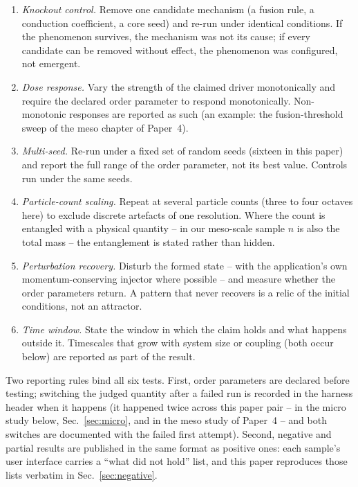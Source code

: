 \documentclass[aps,reprint,amsmath,amssymb,nofootinbib,superscriptaddress,floatfix]{revtex4-2}
\begin{document}
\begin{enumerate}
\item \emph{Knockout control.} Remove one candidate mechanism (a fusion
  rule, a conduction coefficient, a core seed) and re-run under identical
  conditions. If the phenomenon survives, the mechanism was not its
  cause; if every candidate can be removed without effect, the
  phenomenon was configured, not emergent.
\item \emph{Dose response.} Vary the strength of the claimed driver
  monotonically and require the declared order parameter to respond
  monotonically. Non-monotonic responses are reported as such (an
  example: the fusion-threshold sweep of the meso chapter of Paper~4).
\item \emph{Multi-seed.} Re-run under a fixed set of random seeds
  (sixteen in this paper) and report the full range of the order
  parameter, not its best value. Controls run under the same seeds.
\item \emph{Particle-count scaling.} Repeat at several particle counts
  (three to four octaves here) to exclude discrete artefacts of one
  resolution. Where the count is entangled with a physical quantity --
  in our meso-scale sample $n$ is also the total mass -- the entanglement
  is stated rather than hidden.
\item \emph{Perturbation recovery.} Disturb the formed state -- with the
  application's own momentum-conserving injector where possible -- and
  measure whether the order parameters return. A pattern that never
  recovers is a relic of the initial conditions, not an attractor.
\item \emph{Time window.} State the window in which the claim holds and
  what happens outside it. Timescales that grow with system size or
  coupling (both occur below) are reported as part of the result.
\end{enumerate}

Two reporting rules bind all six tests. First, order parameters are
declared before testing; switching the judged quantity after a failed
run is recorded in the harness header when it happens (it happened twice
across this paper pair -- in the micro study below, Sec.~\ref{sec:micro},
and in the meso study of Paper~4 -- and both
switches are documented with the failed first attempt). Second, negative
and partial results are published in the same format as positive ones:
each sample's user interface carries a ``what did not hold'' list, and
this paper reproduces those lists verbatim in
Sec.~\ref{sec:negative}.
\end{document}
